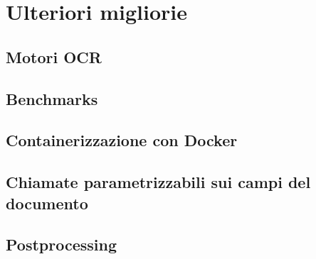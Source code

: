 \chapter{Ulteriori migliorie}
\label{chap:improvements}

\section{Motori OCR}
\section{Benchmarks}
\section{Containerizzazione con Docker}
\section{Chiamate parametrizzabili sui campi del documento}
\section{Postprocessing}
